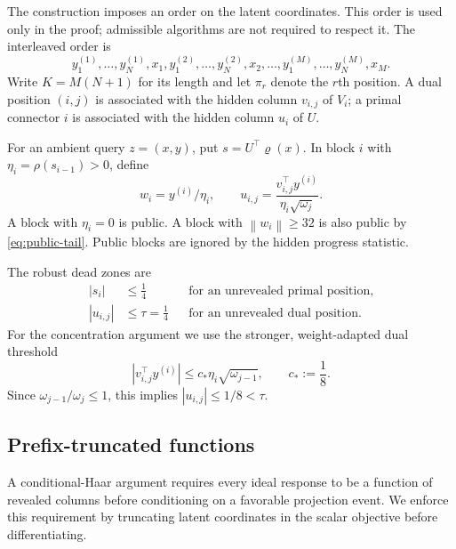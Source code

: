 \documentclass[11pt,a4paper]{article}
\newcommand{\norm}[1]{\left\lVert #1\right\rVert}
\theoremstyle{definition}
\theoremstyle{remark}
\numberwithin{equation}{section}
\begin{document}
The construction imposes an order on the latent coordinates. This order
is used only in the proof; admissible algorithms are not required to
respect it. The interleaved order is
\begin{equation}
 y^{(1)}_1,\ldots,y^{(1)}_N,x_1,
 y^{(2)}_1,\ldots,y^{(2)}_N,x_2,\ldots,
 y^{(M)}_1,\ldots,y^{(M)}_N,x_M.
 \label{eq:global-order}
\end{equation}
Write $K=M(N+1)$ for its length and let $\pi_r$ denote the $r$th position.  A dual position $(i,j)$ is associated with the hidden column $v_{i,j}$ of $V_i$; a primal connector $i$ is associated with the hidden column $u_i$ of $U$.

For an ambient query $z=(x,y)$, put $s=U^\top\varrho(x)$.  In block $i$ with $\eta_i=\rho(s_{i-1})>0$, define
\[
 w_i=y^{(i)}/\eta_i,
 \qquad
 u_{i,j}=\frac{v_{i,j}^\top y^{(i)}}{\eta_i\sqrt{\omega_j}}.
\]
A block with $\eta_i=0$ is public.  A block with $\norm{w_i}\ge32$ is also public by \eqref{eq:public-tail}.  Public blocks are ignored by the hidden progress statistic.

The robust dead zones are
\begin{equation}
 \begin{aligned}
  |s_i|&\le\frac14
  &&\text{for an unrevealed primal position},\\
  |u_{i,j}|&\le\tau=\frac14
  &&\text{for an unrevealed dual position}.
 \end{aligned}
 \label{eq:robust-dead-zones}
\end{equation}
For the concentration argument we use the stronger, weight-adapted dual threshold
\begin{equation}
 |v_{i,j}^\top y^{(i)}|
 \le c_*\eta_i\sqrt{\omega_{j-1}},
 \qquad c_*:=\frac18.
 \label{eq:weight-threshold}
\end{equation}
Since $\omega_{j-1}/\omega_j\le1$, this implies $|u_{i,j}|\le1/8<\tau$.

\subsection{Prefix-truncated functions}

A conditional-Haar argument requires every ideal response to be a
function of revealed columns before conditioning on a favorable
projection event. We enforce this requirement by truncating latent
coordinates in the scalar objective before differentiating.
\end{document}
